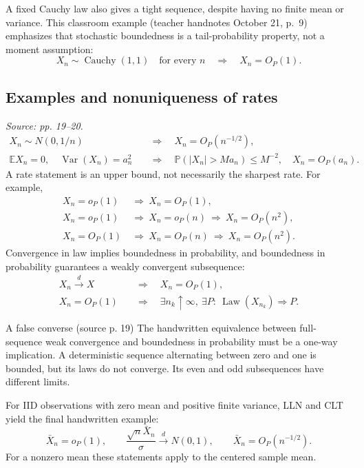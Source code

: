 \documentclass[12pt]{article}
\newcommand{\E}{\mathbb E}
\newcommand{\Prob}{\mathbb P}
\DeclareMathOperator{\Var}{Var}
\DeclareMathOperator{\Law}{Law}
\begin{document}
A fixed Cauchy law also gives a tight sequence, despite having no finite
mean or variance. This classroom example (teacher handnotes October 21,
p.~9) emphasizes that stochastic boundedness is a tail-probability property,
not a moment assumption:
\begin{equation}
 X_n\sim\operatorname{Cauchy}(1,1)\quad\text{for every }n
 \quad\Longrightarrow\quad X_n=O_P(1).
\end{equation}

\subsection{Examples and nonuniqueness of rates}
\textit{Source: pp. 19--20.}
\begin{align}
 X_n\sim N(0,1/n)&\quad\Longrightarrow\quad X_n=O_P(n^{-1/2}),\\
 \E X_n=0,\quad\Var(X_n)=a_n^2
 &\quad\Longrightarrow\quad
 \Prob(|X_n|>Ma_n)\le M^{-2},\quad X_n=O_P(a_n).
\end{align}
A rate statement is an upper bound, not necessarily the sharpest rate.
For example,
\begin{align}
 X_n=o_P(1)&\ \Longrightarrow\ X_n=O_P(1),\\
 X_n=o_P(1)&\ \Longrightarrow\ X_n=o_P(n)\ \Longrightarrow\ X_n=O_P(n^2),\\
 X_n=O_P(1)&\ \Longrightarrow\ X_n=O_P(n)\ \Longrightarrow\ X_n=O_P(n^2).
\end{align}
Convergence in law implies boundedness in probability, and boundedness in
probability guarantees a weakly convergent subsequence:
\begin{align}
 X_n\xrightarrow{d}X&\quad\Longrightarrow\quad X_n=O_P(1),\\
 X_n=O_P(1)&\quad\Longrightarrow\quad
 \exists n_k\uparrow\infty,\ \exists P:\ \Law(X_{n_k})\Rightarrow P.
\end{align}
\begin{correctionbox}{A false converse (source p. 19)}
The handwritten equivalence between full-sequence weak convergence and
boundedness in probability must be a one-way implication. A deterministic
sequence alternating between zero and one is bounded, but its laws do not
converge. Its even and odd subsequences have different limits.
\end{correctionbox}
For IID observations with zero mean and positive finite variance, LLN and
CLT yield the final handwritten example:
\begin{equation}
 \bar X_n=o_P(1),\qquad
 \frac{\sqrt n\bar X_n}{\sigma}\xrightarrow{d}N(0,1),
 \qquad\bar X_n=O_P(n^{-1/2}).
\end{equation}
For a nonzero mean these statements apply to the centered sample mean.
\end{document}
